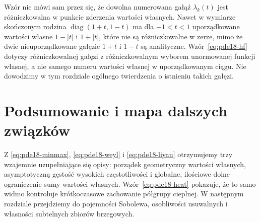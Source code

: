 \begin{uwaga}
Wzór nie mówi sam przez się, że dowolna numerowana gałąź
$\lambda_k(t)$ jest różniczkowalna w punkcie zderzenia
wartości własnych. Nawet w wymiarze skończonym rodzina
$\operatorname{diag}(1+t,1-t)$ ma dla $-1<t<1$
uporządkowane wartości własne $1-|t|$ i $1+|t|$,
które nie są różniczkowalne w zerze, mimo że dwie
nieuporządkowane gałęzie $1+t$ i $1-t$ są analityczne.
Wzór~\eqref{eq:pde18-hf} dotyczy różniczkowalnej gałęzi
z różniczkowalnym wyborem unormowanej funkcji własnej,
a nie samego numeru wartości własnej w uporządkowanym
ciągu. Nie dowodzimy w tym rozdziale ogólnego twierdzenia
o istnieniu takich gałęzi.
\end{uwaga}

\section{Podsumowanie i mapa dalszych związków}
\label{sec:pde18-summary}
Z \eqref{eq:pde18-minmax}, \eqref{eq:pde18-weyl} i
\eqref{eq:pde18-liyau} otrzymujemy trzy wzajemnie
uzupełniające się opisy: porządek geometryczny wartości
własnych, asymptotyczną gęstość wysokich częstotliwości
i globalne, ilościowe dolne ograniczenie sumy wartości
własnych. Wzór~\eqref{eq:pde18-heat} pokazuje, że to samo
widmo kontroluje krótkoczasowe zachowanie półgrupy cieplnej.
W następnym rozdziale przejdziemy do pojemności
Sobolewa, osobliwości usuwalnych i własności subtelnych
zbiorów brzegowych.
